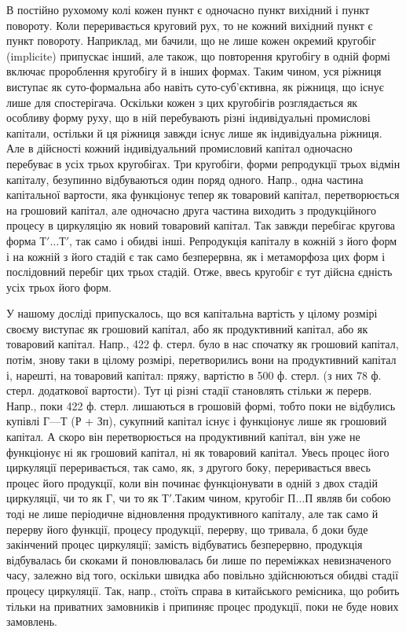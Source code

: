 В постійно рухомому колі кожен пункт є одночасно пункт вихідний
і пункт повороту. Коли переривається круговий рух, то не кожний
вихідний пункт є пункт повороту. Наприклад, ми бачили, що не лише
кожен окремий кругобіг (implicite) припускає інший, але також, що
повторення кругобігу в одній формі включає пророблення кругобігу й
в інших формах. Таким чином, уся ріжниця виступає як суто-формальна
або навіть суто-суб’єктивна, як ріжниця, що існує лише для спостерігача.
Оскільки кожен з цих кругобігів розглядається як особливу форму
руху, що в ній перебувають різні індивідуальні промислові капітали, остільки
й ця ріжниця завжди існує лише як індивідуальна ріжниця. Але в дійсності
кожний індивідуальний промисловий капітал одночасно перебуває
в усіх трьох кругобігах. Три кругобіги, форми репродукції трьох відмін
капіталу, безупинно відбуваються один поряд одного. Напр., одна частина
капітальної вартости, яка функціонує тепер як товаровий капітал, перетворюється
на грошовий капітал, але одночасно друга частина виходить
з продукційного процесу в циркуляцію як новий товаровий капітал. Так
завжди перебігає кругова форма $Т'\dots{} Т'$, так само і обидві інші. Репродукція
капіталу в кожній з його форм і на кожній з його стадій
є так само безперервна, як і метаморфоза цих форм і послідовний перебіг
цих трьох стадій. Отже, ввесь кругобіг є тут дійсна єдність усіх трьох
його форм.

У нашому досліді припускалось, що вся капітальна вартість у цілому розмірі
своєму виступає як грошовий капітал, або як продуктивний капітал, або як
товаровий капітал. Напр., 422 ф. стерл. було в нас спочатку як грошовий
капітал, потім, знову таки в цілому розмірі, перетворились вони на
продуктивний капітал і, нарешті, на товаровий капітал: пряжу, вартістю
в 500 ф. стерл. (з них 78 ф. стерл. додаткової вартости). Тут ці різні
стадії становлять стільки ж перерв. Напр., поки 422 ф. стерл. лишаються
в грошовій формі, тобто поки не відбулись купівлі $Г — Т$ (Р + Зп),
сукупний капітал існує і функціонує лише як грошовий капітал. А скоро
він перетворюється на продуктивний капітал, він уже не функціонує ні
як грошовий капітал, ні як товаровий капітал. Увесь процес його циркуляції
переривається, так само, як, з другого боку, переривається ввесь
процес його продукції, коли він починає функціонувати в одній з двох
стадій циркуляції, чи то як Г, чи то як $Т'. Т$аким чином, кругобіг $П\dots{} П$
являв би собою тоді не лише періодичне відновлення продуктивного
капіталу, але так само й перерву його функції, процесу продукції, перерву,
що тривала, б доки буде закінчений процес циркуляції; замість відбуватись
безперервно, продукція відбувалась би скоками й поновлювалась би лише
по переміжках невизначеного часу, залежно від того, оскільки швидка
або повільно здійснюються обидві стадії процесу циркуляції. Так, напр.,
стоїть справа в китайського ремісника, що робить тільки на приватних
замовників і припиняє процес продукції, поки не буде нових замовлень.

